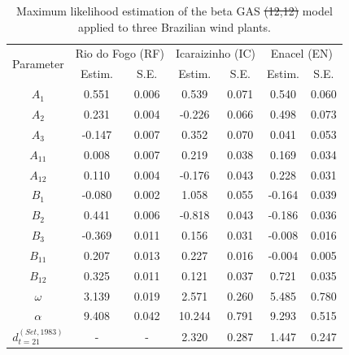\documentclass[a4paper]{IEEEtran}
\providecommand{\DIFadd}[1]{{\protect\color{blue}\uwave{#1}}} %
\providecommand{\DIFdel}[1]{{\protect\color{red}\sout{#1}}}                      %
\providecommand{\DIFaddFL}[1]{\DIFadd{#1}} %
\providecommand{\DIFdelFL}[1]{\DIFdel{#1}} %
\providecommand{\DIFaddbeginFL}{} %
\providecommand{\DIFaddendFL}{} %
\providecommand{\DIFdelbeginFL}{} %
\providecommand{\DIFdelendFL}{} %
\begin{document}
\begin{table}[htbp]
\centering
\caption{Maximum likelihood estimation of the beta GAS \DIFdelbeginFL \DIFdelFL{(12,12) }\DIFdelendFL model applied to three Brazilian wind plants.}
\DIFdelbeginFL %
\DIFdelendFL \begin{tabular}{ccccccc}
\multirow{2}{*}{Parameter} & \multicolumn{2}{c}{Rio do Fogo (RF)} & \multicolumn{2}{c}{Icaraizinho (IC)} & \multicolumn{2}{c}{Enacel (EN)} \\
                           & Estim.     & S.E.      & Estim.     & S.E.      & Estim.     & S.E.      \\ \hline
$A_{1}$                    & 0.551      & 0.006     & 0.539     & 0.071      & 0.540      & 0.060     \\
$A_{2}$                    & 0.231      & 0.004     & -0.226      & 0.066     & 0.498     & 0.073     \\
$A_{3}$                    & -0.147     & 0.007     & 0.352      & 0.070     & 0.041      & 0.053     \\
$A_{11}$                   & 0.008      & 0.007     & 0.219      & 0.038     & 0.169      & 0.034     \\
$A_{12}$                   & 0.110       & 0.004     & -0.176      & 0.043     & 0.228     & 0.031     \\
$B_{1}$                    & -0.080      & 0.002     & 1.058      & 0.055     & -0.164      & 0.039     \\
$B_{2}$                    & 0.441      & 0.006     & -0.818     & 0.043     & -0.186     & 0.036     \\
$B_{3}$                    & -0.369     & 0.011     & 0.156    & 0.031     & -0.008       & 0.016     \\
$B_{11}$                   & 0.207      & 0.013     & 0.227      & 0.016     & -0.004       & 0.005      \\
$B_{12}$                   & 0.325      & 0.011     & 0.121      & 0.037     & 0.721      & 0.035     \\
$\omega$                   & 3.139      & 0.019     & 2.571     & 0.260     & 5.485      & 0.780     \\
$\alpha$                   & 9.408      & 0.042     & 10.244     & 0.791     & 9.293      & 0.515     \\
\DIFdelbeginFL \DIFdelFL{$d_{t=21}^{(Set, 1983)}$   }\DIFdelendFL \DIFaddbeginFL \DIFaddFL{$D_{t=21}^{(Set, 1983)}$   }\DIFaddendFL & -          & -         & 2.320      & 0.287     & 1.447          & 0.247         \\

\end{tabular}
\end{table}
\end{document}
